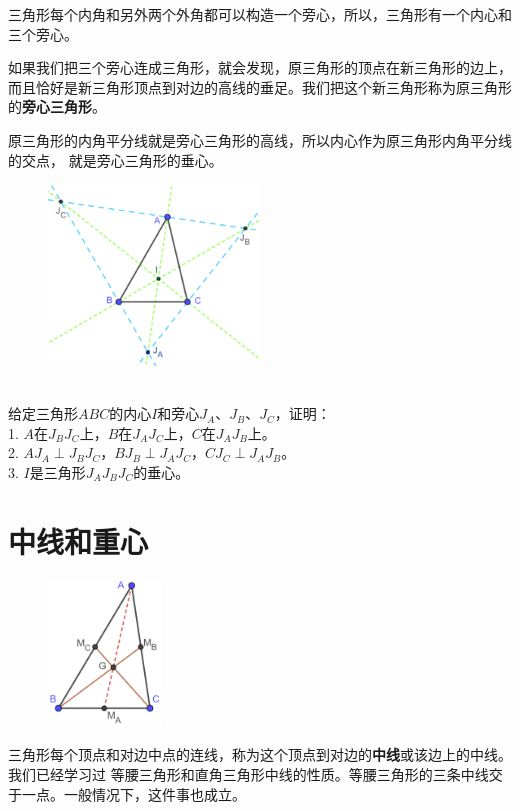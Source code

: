 \documentclass[12pt,UTF8]{ctexbook}
\begin{document}
三角形每个内角和另外两个外角都可以构造一个旁心，所以，三角形有一个内心和三个旁心。

如果我们把三个旁心连成三角形，就会发现，原三角形的顶点在新三角形的边上，
而且恰好是新三角形顶点到对边的高线的垂足。我们把这个新三角形称为原三角形的\textbf{旁心三角形}。

原三角形的内角平分线就是旁心三角形的高线，所以内心作为原三角形内角平分线的交点，
就是旁心三角形的垂心。

\begin{figure}[h] %
    \centering
    \vspace{10pt}
    \includegraphics[width=0.5\textwidth]{tu/三角形内心旁心.png}
\end{figure}

\begin{xt}\label{xt:1-2-0}
    \mbox{}\\
    给定三角形$ABC$的内心$I$和旁心$J_A$、$J_B$、$J_C$，证明：\\
    1. $A$在$J_BJ_C$上，$B$在$J_AJ_C$上，$C$在$J_AJ_B$上。\\
    2. $AJ_A \perp J_BJ_C$，$BJ_B \perp J_AJ_C$，$CJ_C \perp J_AJ_B$。\\
    3. $I$是三角形$J_AJ_BJ_C$的垂心。
\end{xt}

\section{中线和重心}
\begin{figure} %
    \vspace{-60pt}
    \includegraphics[width=0.27\textwidth]{tu/三角形重心证明.png}
\end{figure}
三角形每个顶点和对边中点的连线，称为这个顶点到对边的\textbf{中线}或该边上的中线。我们已经学习过
等腰三角形和直角三角形中线的性质。等腰三角形的三条中线交于一点。一般情况下，这件事也成立。
\end{document}
